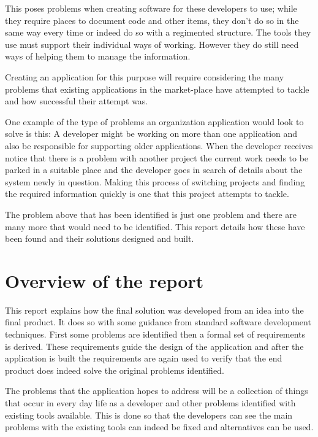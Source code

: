 This poses problems when creating software for these developers to use;
while they require places to document code and other items, they don't
do so in the same way every time or indeed do so with a regimented
structure. The tools they use must support their individual ways of
working. However they do still need ways of helping them to manage the
information.

Creating an application for this purpose will require considering the
many problems that existing applications in the market-place have
attempted to tackle and how successful their attempt was.

One example of the type of problems an organization application would
look to solve is this: A developer might be working on more than one
application and also be responsible for supporting older applications.
When the developer receives notice that there is a problem with another
project the current work needs to be parked in a suitable place and the
developer goes in search of details about the system newly in question.
Making this process of switching projects and finding the required
information quickly is one that this project attempts to tackle.

The problem above that has been identified is just one problem and there
are many more that would need to be identified. This report details how
these have been found and their solutions designed and built.

\section{Overview of the report}\label{overview-of-the-report}

This report explains how the final solution was developed from an idea
into the final product. It does so with some guidance from standard
software development techniques. First some problems are identified then
a formal set of requirements is derived. These requirements guide the
design of the application and after the application is built the
requirements are again used to verify that the end product does indeed
solve the original problems identified.

The problems that the application hopes to address will be a collection
of things that occur in every day life as a developer and other problems
identified with existing tools available. This is done so that the
developers can see the main problems with the existing tools can indeed
be fixed and alternatives can be used.
